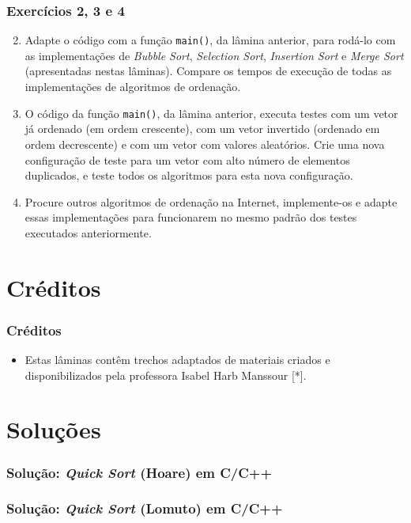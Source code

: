 \documentclass[aspectratio=169]{beamer}
\begin{document}
\begin{frame}\frametitle{Exercícios 2, 3 e 4}
\begin{enumerate}
        \setcounter{enumi}{1}
	\item Adapte o código com a função \texttt{main()}, da lâmina anterior, para rodá-lo com as implementações de \emph{Bubble Sort}, \emph{Selection Sort}, \emph{Insertion Sort} e \emph{Merge Sort} (apresentadas nestas lâminas). Compare os tempos de execução de todas as implementações de algoritmos de ordenação.
	\item O código da função \texttt{main()}, da lâmina anterior, executa testes com um vetor já ordenado (em ordem crescente), com um vetor invertido (ordenado em ordem decrescente) e com um vetor com valores aleatórios. Crie uma nova configuração de teste para um vetor com alto número de elementos duplicados, e teste todos os algoritmos para esta nova configuração.
	\item Procure outros algoritmos de ordenação na Internet, implemente-os e adapte essas implementações para funcionarem no mesmo padrão dos testes executados anteriormente.
\end{enumerate}
\end{frame}

\section{Créditos}

\begin{frame}\frametitle{Créditos}
\begin{itemize}
	\item Estas lâminas contêm trechos adaptados de materiais criados e disponibilizados pela professora Isabel Harb Manssour [*].
\end{itemize}
\end{frame}

\section{Soluções}

\begin{frame}\frametitle{Solução: \emph{Quick Sort} (Hoare) em C/C++}

\end{frame}

\begin{frame}\frametitle{Solução: \emph{Quick Sort} (Lomuto) em C/C++}

\end{frame}

\end{document}
